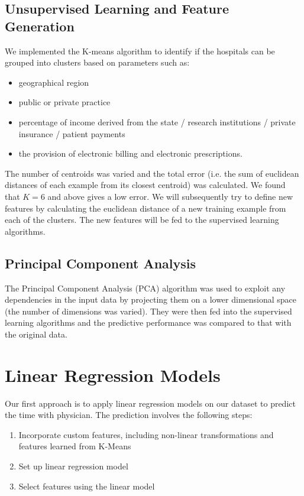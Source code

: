 \documentclass[english]{article}
\begin{document}
\subsection{Unsupervised Learning and Feature Generation}

We implemented the K-means algorithm to identify if the hospitals can be grouped into clusters based on parameters such as:

\begin{itemize}[noitemsep,nolistsep]
  \item geographical region
  \item public or private practice
  \item percentage of income derived from the state / research institutions / private insurance / patient payments
  \item the provision of electronic billing and electronic prescriptions. 
\end{itemize}

The number of centroids was varied and the total error (i.e. the sum of euclidean distances of each example from its closest centroid) was calculated. We found that $K=6$ and above gives a low error.
We will subsequently try to define new features by calculating the euclidean distance of a new training example from each of the clusters. The new features will be fed to the supervised learning algorithms.

\subsection{Principal Component Analysis}

The Principal Component Analysis (PCA) algorithm was used to exploit any dependencies in the input data by projecting them on a lower dimensional space (the number of dimensions was varied).
They were then fed into the supervised learning algorithms and the predictive performance was compared to that with the original data.


\section{Linear Regression Models}
\label{sec/linear}

Our first approach is to apply linear regression models on our dataset to predict the time with physician.
The prediction involves the following steps:

\begin{enumerate}
  \item Incorporate custom features, including non-linear transformations and features learned from K-Means
  \item Set up linear regression model
  \item Select features using the linear model
\end{enumerate}
\end{document}
